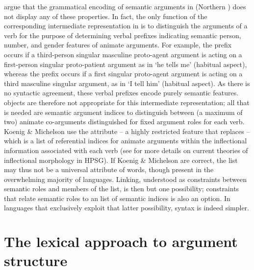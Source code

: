 \documentclass[output=paper
 	        ,biblatex
                ,babelshorthands
                ,newtxmath
                ,draftmode
                ,colorlinks, citecolor=brown
]{langscibook}
\begin{document}
\noindent
\citet{KoenigandMichelson2014,KoenigandMichelson2015a,KoenigandMichelson2015b} argue that the grammatical encoding of semantic arguments in  (Northern )  does not display any of these properties.  In fact, the only function of the
corresponding intermediate representation in  is to distinguish
the arguments of a verb for the purpose of determining verbal
prefixes indicating semantic person, number, and gender
features of animate arguments.  
For example,  the prefix  occurs if a third-person singular masculine proto-agent argument is acting on a first-person singular proto-patient argument as in   `he tells me’ (habitual aspect), whereas  the prefix  occurs if a first singular proto-agent argument is acting on a third masculine singular argument, as in  `I tell him’ (habitual aspect).
 As there is no syntactic agreement, these verbal prefixes encode purely semantic features.
 objects are therefore not appropriate for this intermediate
representation; all that is needed are semantic argument indices to
distinguish between (a maximum of two) animate co-arguments
distinguished for fixed argument roles for each verb.
Koenig \& Michelson use the attribute  -- a highly restricted
 feature that replaces \argst --  which is a list of referential indices for animate arguments within the inflectional information associated with each verb (see  for more details on current theories of inflectional morphology in HPSG).
 If Koenig \& Michelson are correct, the \argst list may thus not be a universal attribute of words, though present in the overwhelming majority of languages.
Linking, understood as constraints between semantic roles and members of the \argst list, is then but one possibility; constraints that relate semantic roles to an  list of semantic indices is also an option.
In languages that exclusively exploit that latter possibility, syntax is indeed simpler.



\section{The lexical approach to argument structure}
\label{lexicalapproach}
\end{document}
